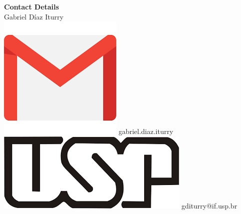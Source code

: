 \documentclass[a4paper,12pt,final]{memoir}
\begin{document}
\begin{flushleft}\small
    \vspace{10mm}
    \textbf{Contact Details}\\
    \vspace{1mm}
	Gabriel D\'iaz Iturry\\
	\vspace{1mm}
    \includegraphics[width=0.07\columnwidth]{gmail_icon.png} gabriel.diaz.iturry\\
    \vspace{1mm}
    \includegraphics[width=0.08\columnwidth]{usp_icon.png} 
gditurry@if.usp.br \\

\end{flushleft}
\end{document}
